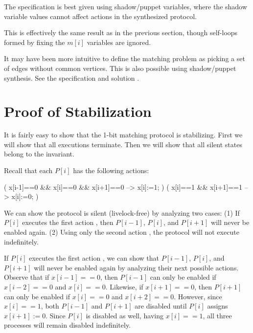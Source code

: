 The specification is best given using shadow/puppet variables, where the shadow variable values cannot affect actions in the synthesized protocol.

This is effectively the same result as in the previous section, though self-loops formed by fixing the $m[i]$ variables are ignored.

It may have been more intuitive to define the matching problem as picking a set of edges without common vertices.
This is also possible using shadow/puppet synthesis.
See the specification  and solution .

\section{Proof of Stabilization}

It is fairly easy to show that the 1-bit matching protocol is stabilizing.
First we will show that all executions terminate.
Then we will show that all silent states belong to the invariant.

Recall that each $P[i]$ has the following actions:
\begin{code}
( x[i-1]==0 && x[i]==0 && x[i+1]==0 --> x[i]:=1; )
(              x[i]==1 && x[i+1]==1 --> x[i]:=0; )
\end{code}

We can show the protocol is silent (livelock-free) by analyzing two cases:
(1) If $P[i]$ executes the first action , then $P[i-1]$, $P[i]$, and $P[i+1]$ will never be enabled again.
(2) Using only the second action , the protocol will not execute indefinitely.

If $P[i]$ executes the first action , we can show that $P[i-1]$, $P[i]$, and $P[i+1]$ will never be enabled again by analyzing their next possible actions.
Observe that if $x[i-1]==0$, then $P[i-1]$ can only be enabled if $x[i-2]==0$ and $x[i]==0$.
Likewise, if $x[i+1]==0$, then $P[i+1]$ can only be enabled if $x[i]==0$ and $x[i+2]==0$.
However, since $x[i]==1$, both $P[i-1]$ and $P[i+1]$ are disabled until $P[i]$ assigns $x[i+1]:=0$.
Since $P[i]$ is disabled as well, having $x[i]==1$, all three processes will remain disabled indefinitely.

